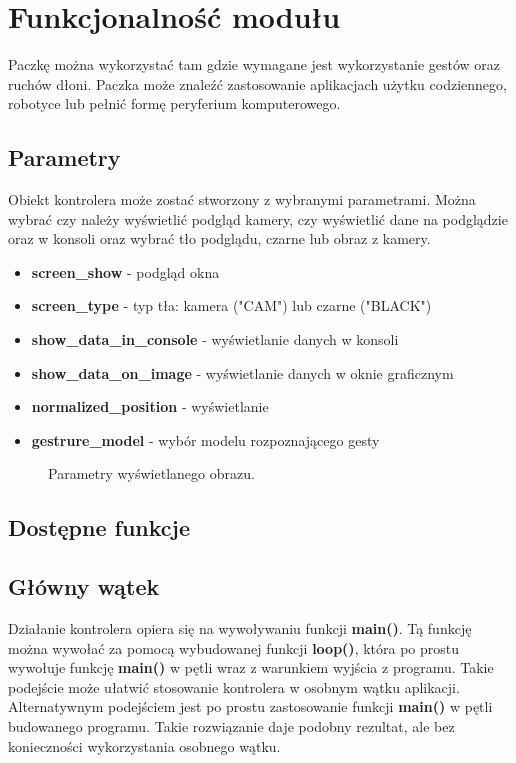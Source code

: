 \section{Funkcjonalność modułu}
\quad Paczkę można wykorzystać tam gdzie wymagane jest wykorzystanie gestów oraz ruchów dłoni. Paczka może znaleźć zastosowanie aplikacjach użytku codziennego, robotyce lub pełnić formę peryferium komputerowego.  

\subsection{Parametry}
\quad Obiekt kontrolera może zostać stworzony z wybranymi parametrami. Można wybrać czy należy wyświetlić podgląd kamery, czy wyświetlić dane na podglądzie oraz w konsoli oraz wybrać tło podglądu, czarne lub obraz z kamery. 

\begin{itemize}
    \item \textbf{screen\_show} - podgląd okna
    \item \textbf{screen\_type} - typ tła: kamera ("CAM") lub czarne ("BLACK")
    \item \textbf{show\_data\_in\_console} - wyświetlanie danych w konsoli
    \item \textbf{show\_data\_on\_image} - wyświetlanie danych w oknie graficznym
    \item \textbf{normalized\_position} - wyświetlanie
    \item \textbf{gestrure\_model} - wybór modelu rozpoznającego gesty
\end{itemize}


\begin{figure}[H]
    \centering
    \hfill
    \caption{Parametry wyświetlanego obrazu.}
\end{figure}

\subsection{Dostępne funkcje}

\subsection{Główny wątek}
\quad Działanie kontrolera opiera się na wywoływaniu funkcji \textbf{main()}. Tą funkcję można wywołać za pomocą wybudowanej funkcji \textbf{loop()}, która po prostu wywołuje funkcję \textbf{main()} w pętli wraz z warunkiem wyjścia z programu. Takie podejście może ułatwić stosowanie kontrolera w osobnym wątku aplikacji. 
\quad Alternatywnym podejściem jest po prostu zastosowanie funkcji \textbf{main()} w pętli budowanego programu. Takie rozwiązanie daje podobny rezultat, ale bez konieczności wykorzystania osobnego wątku. 

